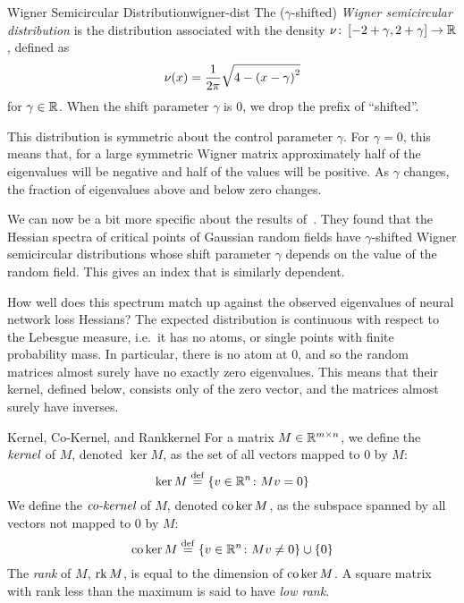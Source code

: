 \documentclass[../../thesis.tex]{subfiles}
\begin{document}
\begin{definition}{Wigner Semicircular Distribution}{wigner-dist}
	The ($\gamma$-shifted) \emph{Wigner semicircular distribution}
	is the distribution associated with the density
	$\nu \colon \left[-2+\gamma, 2+\gamma\right] \to \mathbb{R}$,
	defined as
	\begin{equation}\equationlabel{def-wigner-dist}
		\nu(x) = \frac{1}{2\pi}\sqrt{4 - {(x-\gamma)}^2}
	\end{equation}
	for $\gamma\in\mathbb{R}$.
	When the shift parameter $\gamma$ is $0$,
	we drop the prefix of \enquote{shifted}.
\end{definition}
This distribution is symmetric about the control parameter $\gamma$.
For $\gamma=0$, this means that, for a large symmetric Wigner matrix
approximately half of the eigenvalues will
be negative and half of the values will be positive.
As $\gamma$ changes, the fraction of eigenvalues above and below zero changes.

We can now be a bit more specific about the results of~\cite{bray2007}.
They found that the Hessian spectra of
critical points of Gaussian random fields
have $\gamma$-shifted Wigner semicircular distributions
whose shift parameter $\gamma$ depends on the value of the random field.
This gives an index that is similarly dependent.

How well does this spectrum match up against the observed eigenvalues
of neural network loss Hessians?
The expected distribution is
continuous with respect to the Lebesgue measure,
i.e.~it has no atoms, or single points with finite probability mass.
In particular, there is no atom at $0$,
and so the random matrices almost surely have no exactly zero eigenvalues.
This means that their kernel, defined below, consists only of the zero vector,
and the matrices almost surely have inverses.

\begin{definition}{Kernel, Co-Kernel, and Rank}{kernel}
	For a matrix $M\in\mathbb{R}^{m\times n}$,
	we define the $\emph{kernel}$ of $M$,
	denoted $\ker M$,
	as the set of all vectors mapped to $0$ by $M$:
	\begin{equation}\equationlabel{def-ker}
		\ker M \defeq \Set{v \in \R^n \suchthat Mv = 0}
	\end{equation}
	We define the $\emph{co-kernel}$ of $M$,
	denoted $\operatorname*{co}\ker M$,
	as the subspace spanned by all vectors not mapped to $0$ by $M$:
	\begin{equation}\equationlabel{def-coker}
		\co\ker M \defeq \Set{v \in \R^n \suchthat Mv \neq 0} \cup \Set{0}
	\end{equation}
	The \emph{rank} of $M$, $\operatorname*{rk} M$,
	is equal to the dimension of $\operatorname*{co}\ker M$.
	A square matrix with rank less than the maximum
	is said to have \emph{low rank}.
\end{definition}
\end{document}
